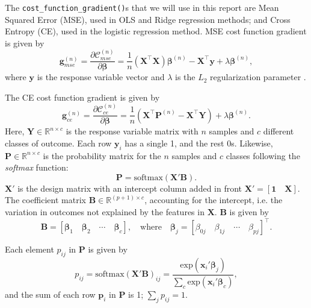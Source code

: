 \documentclass[]{article}
\begin{document}
The \lstinline|cost_function_gradient()|s that we will use in this report are Mean Squared Error (MSE), used in OLS and Ridge regression methods; and Cross Entropy (CE), used in the logistic regression method. MSE cost function gradient is given by
\begin{equation} \label{cost-mse}
	\mathbf{g}_{mse}^{(n)} = \frac{\partial \mathcal{C}_{mse}^{(n)}}{\partial \mathbf{\beta}} = \frac{1}{n} (\mathbf{X}^\intercal \mathbf{X}) \mathbf{\beta}^{(n)} - \mathbf{X}^\intercal \mathbf{y} + \lambda \mathbf{\beta}^{(n)},
\end{equation}
where $\mathbf{y}$ is the response variable vector and $\lambda$ is the $L_2$ regularization parameter \cite{project1}. 

The CE cost function gradient is given by
\begin{equation} \label{cost-mse}
	\mathbf{g}_{ce}^{(n)} = \frac{\partial \mathcal{C}_{ce}^{(n)}}{\partial \mathbf{\beta}} = \frac{1}{n} (\mathbf{X}^\intercal \mathbf{P}^{(n)} - \mathbf{X}^\intercal \mathbf{Y}) + \lambda \mathbf{\beta}^{(n)}.
\end{equation}
Here, $\mathbf{Y} \in \mathbb{R}^{n \times c}$ is the response variable matrix with $n$ samples and $c$ different classes of outcome. Each row $\mathbf{y}_i$ has a single 1, and the rest 0s. Likewise, $\mathbf{P} \in \mathbb{R}^{n \times c}$ is the probability matrix for the $n$ samples and $c$ classes following the \textit{softmax} function:
\begin{equation}
	\mathbf{P} = \mathrm{softmax}(\mathbf{X}'\mathbf{B}).
\end{equation}
$\mathbf{X}'$ is the design matrix with an intercept column added in front $\mathbf{X}' = [\mathbf{1} \quad \mathbf{X}]$. The coefficient matrix $\mathbf{B} \in \mathbb{R}^{(p+1) \times c}$, accounting for the intercept, i.e. the variation in outcomes not explained by the features in $\mathbf{X}$. $\mathbf{B}$ is given by
\begin{equation}
	\mathbf{B} = [\mathbf{\beta}_1 \quad \mathbf{\beta}_2 \quad \cdots \quad \mathbf{\beta}_c], \quad \text{where} \quad \mathbf{\beta}_j = [\beta_{0j} \quad \beta_{1j} \quad \cdots \quad \beta_{pj}]^\intercal.
\end{equation}

Each element $p_{ij}$ in $\mathbf{P}$ is given by
\begin{equation} \label{log-reg-pij}
	p_{ij} = \mathrm{softmax}(\mathbf{X}'\mathbf{B})_{ij} = \frac{\mathrm{exp}(\mathbf{x}_i'\mathbf{\beta}_j)} {\sum_{c}\mathrm{exp}(\mathbf{x}_i'\mathbf{\beta}_c)},
\end{equation}
and the sum of each row $\mathbf{p}_i$ in $\mathbf{P}$ is 1; $\sum_{j} p_{ij} = 1$.
\end{document}
